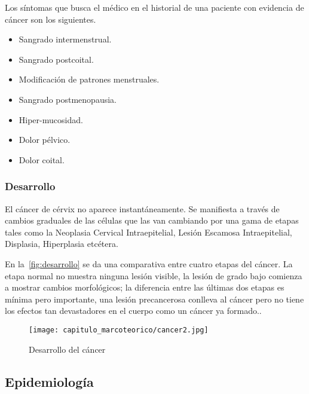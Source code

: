 Los síntomas que busca el médico en el historial de una paciente con evidencia de cáncer
son los siguientes. 

\begin{itemize}
    \item Sangrado intermenstrual.
    \item Sangrado postcoital.
    \item Modificación de patrones menstruales.
    \item Sangrado postmenopausia.
    \item Hiper-mucosidad.
    \item Dolor pélvico.
    \item Dolor coital.
\end{itemize}

\subsubsection{Desarrollo}

El cáncer de cérvix no aparece instantáneamente. Se manifiesta a través de
cambios graduales de las células que las van cambiando por una gama de etapas
tales como la Neoplasia Cervical Intraepitelial, Lesión Escamosa Intraepitelial,
Displasia, Hiperplasia etcétera.~\cite{NacionalCancerInstitute2012}

En la~\autoref{fig:desarrollo} se da una comparativa entre cuatro etapas del
cáncer. La etapa normal no muestra ninguna lesión visible, la lesión de grado
bajo comienza a mostrar cambios morfológicos; la diferencia entre las últimas
dos etapas es mínima pero importante, una lesión precancerosa conlleva al cáncer
pero no tiene los efectos tan devastadores en el cuerpo como un cáncer ya
formado..

\begin{figure}[H]
    \centering
    \texttt{[image: capitulo\_marcoteorico/cancer2.jpg]}
    \caption{Desarrollo del cáncer}\label{fig:desarrollo}
\end{figure}


\subsection{Epidemiología}

